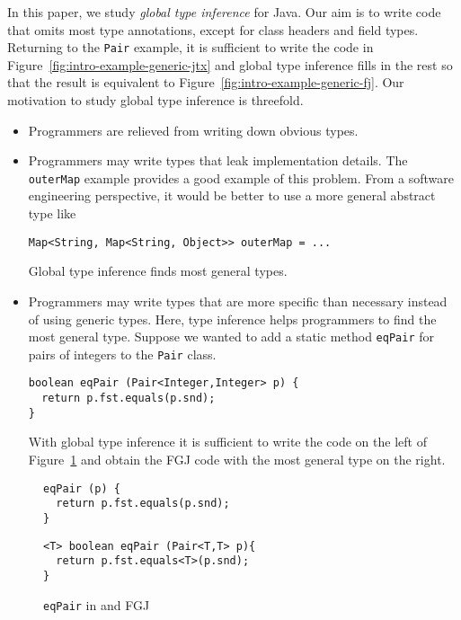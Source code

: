 In this paper, we study \emph{global type inference} for Java. Our aim
is to write code that omits most type annotations, except for class
headers and field types. Returning to the \lstinline{Pair} example, it
is sufficient to write the code in Figure~\ref{fig:intro-example-generic-jtx}
and global type inference fills in the rest so that the result is
equivalent to Figure~\ref{fig:intro-example-generic-fj}. Our
motivation to study global type inference is threefold.
\begin{itemize}
\item Programmers are relieved from writing down obvious types. 
\item Programmers may write types that leak implementation details. The
  \lstinline{outerMap} example provides a good example of this
  problem. From a software engineering
  perspective, it would be better to use a more general abstract type like
\begin{lstlisting}[basicstyle=\ttfamily\fontsize{8}{9.6}\selectfont,style=fgj]
Map<String, Map<String, Object>> outerMap = ...
\end{lstlisting}
  Global type inference finds most general types.
\item Programmers may write types that are more specific than
  necessary instead of using generic types. Here, type
  inference helps programmers to find the most general type. Suppose
  we wanted to add a static  method \texttt{eqPair} for pairs of integers to the
  \lstinline/Pair/ class.
\begin{lstlisting}[basicstyle=\ttfamily\fontsize{8}{9.6}\selectfont,style=fgj]
boolean eqPair (Pair<Integer,Integer> p) {
  return p.fst.equals(p.snd);
}
\end{lstlisting}
  With global type inference it is sufficient to write the code on the
  left of Figure~\ref{fig:equal-pair} and obtain the FGJ code with the most general type on the right.
\end{itemize}
  \begin{figure}[t]
    \begin{minipage}[t]{0.49\linewidth}
\begin{lstlisting}[style=tfgj]
eqPair (p) {
  return p.fst.equals(p.snd);
}
\end{lstlisting}
    \end{minipage}
    \begin{minipage}[t]{0.49\linewidth}
\begin{lstlisting}[style=fgj]
<T> boolean eqPair (Pair<T,T> p){
  return p.fst.equals<T>(p.snd);
}
\end{lstlisting}
    \end{minipage}
    \caption{\lstinline{eqPair} in \TFGJ and FGJ}
    \label{fig:equal-pair}
  \end{figure}

